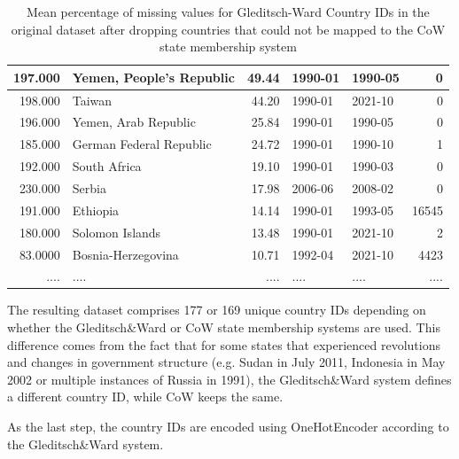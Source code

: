 \documentclass[runningheads]{llncs}
\begin{document}
\begin{table}[h]
\begin{tabular}{|r|l|r|l|l|r|}
            197.000 & Yemen, People's Republic                     & 49.44  & 1990-01 & 1990-05 & 0     \\ \hline
            198.000 & Taiwan                   & 44.20  & 1990-01 & 2021-10 & 0 \\ \hline
            196.000 & Yemen, Arab Republic            & 25.84  & 1990-01 & 1990-05 & 0     \\ \hline
            185.000 & German Federal Republic         & 24.72  & 1990-01 & 1990-10 & 1  \\ \hline
            192.000    & South Africa                       & 19.10   & 1990-01    & 1990-03    & 0  \\ \hline
            230.000    & Serbia                       & 17.98   & 2006-06    & 2008-02    & 0  \\ \hline
            191.000    & Ethiopia                       & 14.14   & 1990-01    & 1993-05    & 16545  \\ \hline
            180.000    & Solomon Islands                       & 13.48   & 1990-01    & 2021-10    & 2  \\ \hline
            83.0000    & Bosnia-Herzegovina                       & 10.71   & 1992-04    & 2021-10    & 4423  \\ \hline
            ....    & ....                       & ....   & ....    & ....    & ....  \\ \hline
        \end{tabular}
        \caption{Mean percentage of missing values for Gleditsch-Ward Country IDs in the original dataset after dropping countries that could not be mapped to the CoW state membership system}
        \label{tab:missing_values}
    \end{table}


    The resulting dataset comprises 177 or 169 unique country IDs depending on whether the Gleditsch\&Ward or CoW state membership systems are used. This difference comes from the fact that for some states that experienced revolutions and changes in government structure (e.g. Sudan in July 2011, Indonesia in May 2002 or multiple instances of Russia in 1991), the Gleditsch\&Ward system defines a different country ID, while CoW keeps the same.

    As the last step, the country IDs are encoded using OneHotEncoder according to the Gleditsch\&Ward system.
\end{document}
